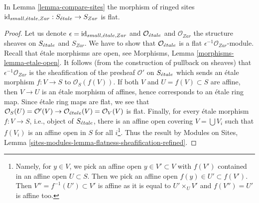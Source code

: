 \begin{lemma}
\label{lemma-compare-etale-zariski-flat}
In Lemma \ref{lemma-compare-sites} the morphism of ringed
sites $\text{id}_{small, {\acute{e}tale}, Zar} : S_{\acute{e}tale} \to S_{Zar}$ is flat.
\end{lemma}

\begin{proof}
Let us denote $\epsilon = \text{id}_{small, {\acute{e}tale}, Zar}$ and
$\mathcal{O}_{\acute{e}tale}$ and $\mathcal{O}_{Zar}$ the structure
sheaves on $S_{\acute{e}tale}$ and $S_{Zar}$. We have to show that
$\mathcal{O}_{\acute{e}tale}$ is a flat $\epsilon^{-1}\mathcal{O}_{Zar}$-module.
Recall that \'etale morphisms are open, see
Morphisms, Lemma \ref{morphisms-lemma-etale-open}.
It follows (from the construction of pullback on sheaves)
that $\epsilon^{-1}\mathcal{O}_{Zar}$ is the sheafification
of the presheaf $\mathcal{O}'$ on $S_{\acute{e}tale}$
which sends an \'etale morphism $f : V \to S$ to $\mathcal{O}_S(f(V))$.
If both $V$ and $U = f(V) \subset S$ are affine,
then $V \to U$ is an \'etale morphism of affines,
hence corresponds to an \'etale ring map.
Since \'etale ring maps are flat, we see that
$\mathcal{O}_S(U) = \mathcal{O}'(V) \to
\mathcal{O}_{\acute{e}tale}(V) = \mathcal{O}_V(V)$ is flat.
Finally, for every \'etale morphism $f : V \to S$, i.e., object of
$S_{\acute{e}tale}$, there is an affine open covering $V = \bigcup V_i$
such that $f(V_i)$ is an affine open in
$S$ for all $i$\footnote{Namely, for $y \in V$, we pick an affine open
$y \in V' \subset V$ with $f(V')$ contained in an affine
open $U \subset S$. Then we pick an affine open $f(y) \in U' \subset f(V')$.
Then $V'' = f^{-1}(U') \subset V'$ is affine as it is equal
to $U' \times_U V'$ and $f(V'') = U'$ is affine too.}.
Thus the result by Modules on Sites, Lemma
\ref{sites-modules-lemma-flatness-sheafification-refined}.
\end{proof}

